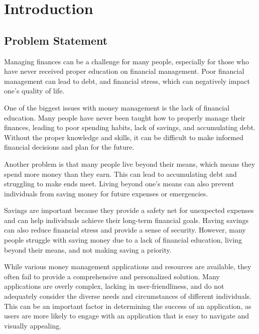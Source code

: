 
\chapter{Introduction}\label{cap:intro}

\section{Problem Statement}\label{sect:description}

\hspace{\parindent}Managing finances can be a challenge for many people, especially for those who have never received proper education on financial management. Poor financial management can lead to debt, and financial stress, which can negatively impact one's quality of life.

\hspace{\parindent}One of the biggest issues with money management is the lack of financial education. Many people have never been taught how to properly manage their finances, leading to poor spending habits, lack of savings, and accumulating debt. Without the proper knowledge and skills, it can be difficult to make informed financial decisions and plan for the future.

\hspace{\parindent}Another problem is that many people live beyond their means, which means they spend more money than they earn. This can lead to accumulating debt and struggling to make ends meet. Living beyond one's means can also prevent individuals from saving money for future expenses or emergencies.

\hspace{\parindent}Savings are important because they provide a safety net for unexpected expenses and can help individuals achieve their long-term financial goals. Having savings can also reduce financial stress and provide a sense of security. However, many people struggle with saving money due to a lack of financial education, living beyond their means, and not making saving a priority.

\hspace{\parindent}While various money management applications and resources are available, they often fail to provide a comprehensive and personalized solution. Many applications are overly complex, lacking in user-friendliness, and do not adequately consider the diverse needs and circumstances of different individuals. This can be an important factor in determining the success of an application, as users are more likely to engage with an application that is easy to navigate and visually appealing.


